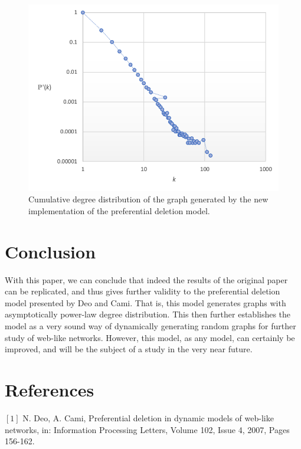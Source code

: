 \documentclass[final,3p,times,twocolumn]{elsarticle}
\begin{document}
\begin{figure}[h]
\centering\includegraphics[width=1\linewidth]{cumulative-distribution.png}
\caption{Cumulative degree distribution of the graph generated by the new implementation of the preferential deletion model.}
\end{figure}

\section{Conclusion}
\label{S:8}

With this paper, we can conclude that indeed the results of the original paper can be replicated, and thus gives further validity to the preferential deletion model presented by Deo and Cami. That is, this model generates graphs with asymptotically power-law degree distribution. This then further establishes the model as a very sound way of dynamically generating random graphs for further study of web-like networks. However, this model, as any model, can certainly be improved, and will be the subject of a study in the very near future.

\section{References}
\label{S:9}

$[1]$ N. Deo, A. Cami, Preferential deletion in dynamic models of web-like networks, in: Information Processing Letters, Volume 102, Issue 4, 2007, Pages 156-162.
\end{document}
